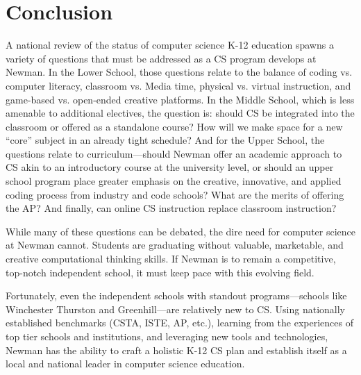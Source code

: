 
\chapter{Conclusion} %

\label{Chapter5} %




A national review of the status of computer science K-12 education spawns a variety of questions that must be addressed as a CS program develops at Newman. In the Lower School, those questions relate to the balance of coding vs. computer literacy, classroom vs. Media time, physical vs. virtual instruction, and game-based vs. open-ended creative platforms. In the Middle School, which is less amenable to additional electives, the question is: should CS be integrated into the classroom or offered as a standalone course? How will we make space for a new ``core'' subject in an already tight schedule? And for the Upper School, the questions relate to curriculum---should Newman offer an academic approach to CS akin to an introductory course at the university level, or should an upper school program place greater emphasis on the creative, innovative, and applied coding process from industry and code schools? What are the merits of offering the AP? And finally, can online CS instruction replace classroom instruction? \par
While many of these questions can be debated, the dire need for computer science at Newman cannot. Students are graduating without valuable, marketable, and creative computational thinking skills. If Newman is to remain a competitive, top-notch independent school, it must keep pace with this evolving field.\par
Fortunately, even the independent schools with standout programs---schools like Winchester Thurston and Greenhill---are relatively new to CS. Using nationally established benchmarks (CSTA, ISTE, AP, etc.), learning from the experiences of top tier schools and institutions, and leveraging new tools and technologies, Newman has the ability to craft a holistic K-12 CS plan and establish itself as a local and national leader in computer science education.\par
